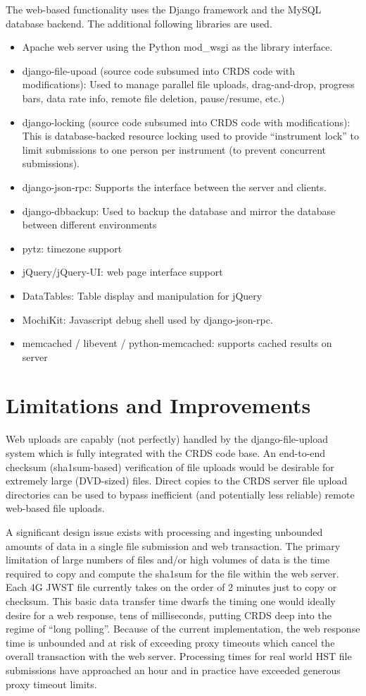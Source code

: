\documentclass[final,authoryear,5p,times,twocolumn]{elsarticle}
\begin{document}
The web-based functionality uses the Django framework and the MySQL database
backend. The additional following libraries are used.

\begin{itemize}
\item Apache web server using the Python mod\_wsgi as the library interface.
\item django-file-upoad (source code subsumed into CRDS code with modifications):
  Used to  manage parallel file uploads, drag-and-drop, progress bars, data rate info,  remote file deletion,  pause/resume,  etc.)
\item django-locking (source code subsumed into CRDS code with modifications):
  This is database-backed resource locking used to provide ``instrument lock''
   to limit submissions to one person per instrument (to prevent concurrent 
   submissions).
\item django-json-rpc: Supports the interface between the server and clients.
\item django-dbbackup: Used to backup the database and mirror the database between
  different environments
\item pytz: timezone support
\item jQuery/jQuery-UI: web page interface support
\item DataTables: Table display and manipulation for jQuery
\item MochiKit: Javascript debug shell used by django-json-rpc.
\item memcached / libevent / python-memcached: supports cached results on server
\end{itemize}

\section{Limitations and Improvements}

Web uploads are capably (not perfectly) handled by the django-file-upload
system which is fully integrated with the CRDS code base.  An end-to-end
checksum (sha1sum-based) verification of file uploads would be desirable
for extremely large
(DVD-sized) files.  Direct copies to the CRDS server file upload directories
can be used to bypass inefficient (and potentially less reliable) remote
web-based file uploads.

A significant design issue exists with processing and ingesting unbounded
amounts of data in a single file submission and web transaction.  
The primary limitation of large numbers of files and/or high volumes
of data is the time required to copy and compute 
the sha1sum for the file within
the web server.  Each 4G JWST file currently takes on the order of 
2 minutes just to copy or checksum.   This basic data transfer
time dwarfs the timing one would ideally desire for a web response,  
tens of milliseconds, putting CRDS deep into the regime of ``long polling''.    
Because of the current implementation, the web response time is
unbounded and at risk of exceeding proxy timeouts which cancel 
the overall transaction with the web server.   Processing times for 
real world HST file submissions have approached an hour and
in practice have exceeded generous proxy timeout limits.
\end{document}
